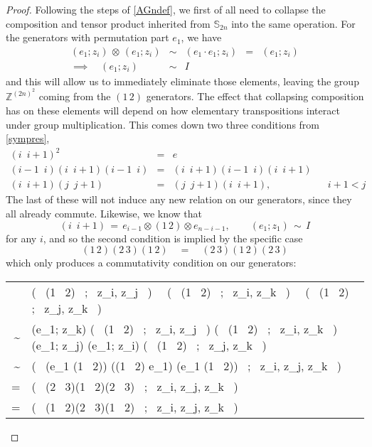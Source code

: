\documentclass{amsbook} %
\numberwithin{section}{chapter}
\begin{document}
\begin{proof}
Following the steps of \cref{AGndef}, we first of all need to collapse the composition and tensor product inherited from $\mathbb{S}_{2n}$ into the same operation. For the generators with permutation part $e_1$, we have
\[ \begin{array}{rllll}
			(e_1; z_i) \, \otimes \, (e_1; z_i) & \sim & (e_1 \cdot e_1; z_i) & = & (e_1; z_i) \\
			\implies \quad (e_1; z_i) & \sim & I
		\end{array}
\]
and this will allow us to immediately eliminate those elements, leaving the group $\mathbb{Z}^{(2n)^2}$ coming from the $(1 \, 2)$ generators. The effect that collapsing composition has on these elements will depend on how elementary transpositions interact under group multiplication. This comes down two three conditions from \cref{sympres},
\[ \begin{array}{rclll}
			(i \, \, \, i+1)^2 & = & e & & \\
			(i-1 \, \, \, i)(i \, \, \, i+1)(i-1 \, \, \, i) & = & (i \, \, \, i+1)(i-1 \, \, \, i)(i \, \, \, i+1) & & \\
			(i \, \, \, i+1)(j \, \, \, j+1) & = & (j \, \, \, j+1)(i \, \, \, i+1), & & i+1 < j
		\end{array}
\]
The last of these will not induce any new relation on our generators, since they all already commute. Likewise, we know that 
\[ (i \, \, \,  i+1) \, = \, e_{i-1} \otimes (1 \, 2) \otimes e_{n-i-1}, \quad \quad (e_1; z_1) \, \sim \, I  \]
for any $i$, and so the second condition is implied by the specific case
\[ (1 \, 2)(2 \, 3)(1 \, 2) \quad = \quad (2 \, 3)(1 \, 2)(2 \, 3) \]
which only produces a commutativity condition on our generators:
\begin{longtable}{RL}
			& \big( \, (1 \, 2) \, ; \, z_i, z_j \, \big) \, \otimes \, \big( \, (1 \, 2) \, ; \, z_i, z_k \, \big) \, \otimes \, \big( \, (1 \, 2) \, ; \, z_j, z_k \, \big) \\
			\sim & (e_1; z_k) \otimes \big( \, (1 \, 2) \, ; \, z_i, z_j \, \big) \otimes \big( \, (1 \, 2) \, ; \, z_i, z_k \, \big) \otimes (e_1; z_j) \otimes (e_1; z_i) \otimes \big( \, (1 \, 2) \, ; \, z_j, z_k \, \big)\\
			\sim & \big( \, (e_1 \otimes (1 \, 2)) \cdot ((1 \, 2) \otimes e_1) \cdot (e_1 \otimes (1 \, 2)) \, ; \, z_i, z_j, z_k \, \big) \\
			= & \big( \, (2 \, 3)(1 \, 2)(2 \, 3) \, ; \, z_i, z_j, z_k \, \big) \\
			= & \big( \, (1 \, 2)(2 \, 3)(1 \, 2)  \, ; \, z_i, z_j, z_k \, \big) \\

\end{longtable}
\end{proof}
\end{document}
